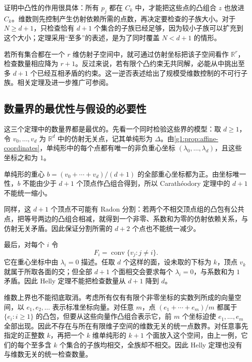 证明中凸性的作用很具体：所有 \(p_j\) 都在 \(C_k\) 中，才能把这些点的凸组合 \(z\) 也放进 \(C_k\)。维数则先控制产生仿射依赖所需的点数，再决定要检查的子族大小。对于 \(N\ge d+1\)，只检查恰有 \(d+1\) 个集合的子族已经足够，因为较小子族可以扩充到这个大小；定理采用“至多”的表述，是为了同时覆盖 \(N<d+1\) 的情形。

\ProseParagraphBreak

若所有集合都在一个 \(r\) 维仿射子空间中，就可通过仿射坐标把该子空间看作 \(\mathbb R^r\)，检查数量相应降为 \(r+1\)。反过来说，若有限个凸约束无共同解，必能从中挑出至多 \(d+1\) 个已经互相矛盾的约束。这一逆否表述给出了规模受维数控制的不可行子族。相关定理及进一步推广可参阅\cite[第3.2, 3.4节]{Gallier2011Geometric}。

\subsection{数量界的最优性与假设的必要性}
\label{g1:subsec:0302:04}

这三个定理中的数量界都是最优的。先看一个同时检验这些界的模型：取 \(d\ge1\)，令 \(v_0,\ldots,v_d\) 为 \(\mathbb R^d\) 中的仿射无关点，记其单纯形为 \(\Delta\)。由\cref{g1:prop:affine-coordinates}，单纯形中的每个点都有唯一的非负重心坐标 \((\lambda_0,\ldots,\lambda_d)\)，且这些坐标之和为 \(1\)。

\begin{example}\label{g1:exm:convex-dimension-sharp}
	单纯形的重心 \(b=(v_0+\cdots+v_d)/(d+1)\) 的全部重心坐标都为正。由坐标唯一性，\(b\) 不能由少于 \(d+1\) 个顶点作凸组合得到，所以 Carathéodory 定理中的 \(d+1\) 不能统一缩小。

	同样，这 \(d+1\) 个顶点不可能有 Radon 分割：若两个不相交顶点组的凸包有公共点，把等号两边的凸组合相减，就得到一个非零、系数和为零的仿射依赖关系，与仿射无关矛盾。因此保证分割所需的 \(d+2\) 个点也不能统一减少。

	最后，对每个 \(i\) 令
	\[
		F_i=\operatorname{conv}\{v_j:j\ne i\}.
	\]
	它在重心坐标中由 \(\lambda_i=0\) 描述。任取 \(d\) 个这样的面，设未取的下标为 \(k\)，顶点 \(v_k\) 就属于所取各面的交；但全部 \(d+1\) 个面相交会要求每个 \(\lambda_i=0\)，与系数和为 \(1\) 矛盾。因此 Helly 定理不能把检查数量从 \(d+1\) 降到 \(d\)。
\end{example}

维数上界也不能彻底取消。考虑所有仅有有限个非零坐标的实数列所成的向量空间，以 \(e_1,e_2,\ldots\) 表示标准坐标向量。对任意 \(m\)，点 \((e_1+\cdots+e_m)/m\) 都属于 \(\{e_i:i\ge1\}\) 的凸包，但要从这些向量作凸组合表示它，前 \(m\) 个坐标迫使 \(e_1,\ldots,e_m\) 全部出现。因此不存在与所在有限维子空间的维数无关的统一点数界。对任意事先指定的正整数 \(k\)，再把一个 \(k\) 维单纯形的 \(k+1\) 个面放入这个空间，由上一例，它们的每个至多含 \(k\) 个集合的子族均相交，全族却不相交。因此 Helly 定理也没有与维数无关的统一检查数量。

